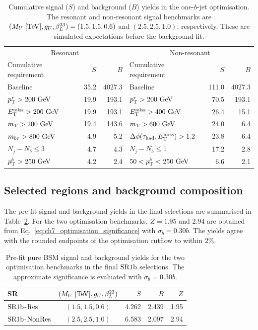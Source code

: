 \begin{table}[htbp]
    \centering
    \small
    \caption{Cumulative signal ($S$) and background ($B$) yields in the one-$b$-jet optimisation. The resonant and non-resonant signal benchmarks are $(M_U~[\mathrm{TeV}],g_U,\beta_L^{23})=(1.5,1.5,0.6)$ and $(2.5,2.5,1.0)$, respectively. These are simulated expectations before the background fit.}
    \label{tab:ch7_cutflow}
    \begin{tabular}{lrrlrr}
        \toprule
        \multicolumn{3}{c}{Resonant} & \multicolumn{3}{c}{Non-resonant} \\
        Cumulative requirement & $S$ & $B$ & Cumulative requirement & $S$ & $B$ \\
        \midrule
        Baseline & 35.2 & 4027.3 & Baseline & 111.0 & 4027.3 \\
        $p_{\mathrm{T}}^\tau>200~\mathrm{GeV}$ & 19.9 & 193.1 & $p_{\mathrm{T}}^\tau>200~\mathrm{GeV}$ & 70.5 & 193.1 \\
        $E_{\mathrm{T}}^{\mathrm{miss}}>200~\mathrm{GeV}$ & 19.9 & 193.1 & $E_{\mathrm{T}}^{\mathrm{miss}}>400~\mathrm{GeV}$ & 26.4 & 15.1 \\
        $m_{\mathrm{T}}>200~\mathrm{GeV}$ & 19.4 & 143.6 & $m_{\mathrm{T}}>600~\mathrm{GeV}$ & 24.0 & 6.4 \\
        $m_{b\tau}>800~\mathrm{GeV}$ & 4.9 & 5.2 & $\Delta\phi(\tau_{\mathrm{had}}, E_{\mathrm{T}}^{\mathrm{miss}})>1.2$ & 23.8 & 6.4 \\
        $N_j-N_b\leq3$ & 4.7 & 4.3 & $N_j-N_b\leq1$ & 17.2 & 2.8 \\
        $p_{\mathrm{T}}^b>250~\mathrm{GeV}$ & 4.2 & 2.4 & $50<p_{\mathrm{T}}^b<250~\mathrm{GeV}$ & 6.6 & 2.1 \\
        \bottomrule
    \end{tabular}
\end{table}

\subsection{Selected regions and background composition}

The pre-fit signal and background yields in the final selections are summarised in Table~\ref{tab:ch7_prefit_yields}.
For the two optimisation benchmarks, $Z=1.95$ and $2.94$ are obtained from Eq.~\ref{eq:ch7_optimisation_significance} with $\sigma_b=0.30b$.
The yields agree with the rounded endpoints of the optimisation cutflow to within $2\%$.

\begin{table}[htbp]
    \centering
    \small
    \caption{Pre-fit pure BSM signal and background yields for the two optimisation benchmarks in the final $\mathrm{SR1b}$ selections. The approximate significance is evaluated with $\sigma_b=0.30b$.}
    \label{tab:ch7_prefit_yields}
    \begin{tabular}{lcrrr}
        \toprule
        SR & $(M_U~[\mathrm{TeV}],g_U,\beta_L^{23})$ & $S$ & $B$ & $Z$ \\
        \midrule
        $\mathrm{SR1b}$-$\mathrm{Res}$ & $(1.5,1.5,0.6)$ & 4.262 & 2.439 & 1.95 \\
        $\mathrm{SR1b}$-$\mathrm{NonRes}$ & $(2.5,2.5,1.0)$ & 6.583 & 2.097 & 2.94 \\
        \bottomrule
    \end{tabular}
\end{table}

